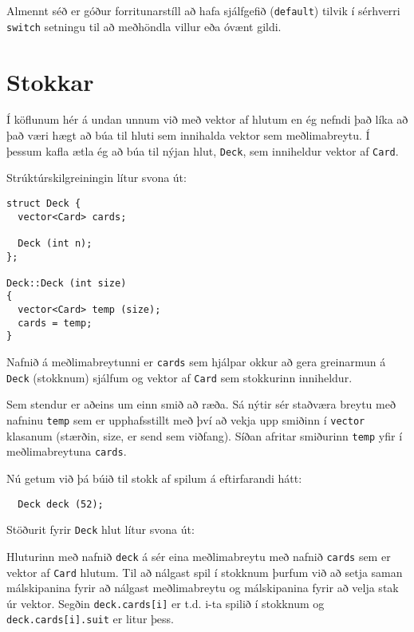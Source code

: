 
Almennt séð er góður forritunarstíll að hafa sjálfgefið ({\tt default}) tilvik í sérhverri     
{\tt switch} setningu til að meðhöndla villur eða óvænt gildi. 

\section{Stokkar}
\label{deck}

Í köflunum hér á undan unnum við með vektor af hlutum 
en ég nefndi það líka að það væri hægt að búa til hluti 
sem innihalda vektor sem meðlimabreytu.
Í þessum kafla ætla ég að búa til nýjan hlut, {\tt Deck},
sem inniheldur vektor af {\tt Card}.


Strúktúrskilgreiningin lítur svona út:

\begin{verbatim}
struct Deck {
  vector<Card> cards;

  Deck (int n);
};

Deck::Deck (int size)
{
  vector<Card> temp (size);
  cards = temp;
}
\end{verbatim}
%
Nafnið á meðlimabreytunni er {\tt cards} sem hjálpar okkur að gera
greinarmun á {\tt Deck} (stokknum) sjálfum og vektor af {\tt Card} sem stokkurinn inniheldur.



Sem stendur er aðeins um einn smið að ræða.
Sá nýtir sér staðværa breytu með nafninu {\tt temp} sem er upphafsstillt
með því að vekja upp smiðinn í {\tt vector} klasanum (stærðin, size, er send sem viðfang).
Síðan afritar smiðurinn {\tt temp} yfir í meðlimabreytuna {\tt cards}.

Nú getum við þá búið til stokk af spilum á eftirfarandi hátt: 

\begin{verbatim}
  Deck deck (52);
\end{verbatim}
%
Stöðurit fyrir {\tt Deck} hlut lítur svona út:


\vspace {0.1in}
\centerline{}
\vspace {0.1in}

Hluturinn með nafnið {\tt deck} á sér eina meðlimabreytu með nafnið {\tt cards}
sem er vektor af {\tt Card} hlutum.
Til að nálgast spil í stokknum þurfum við að setja saman málskipanina fyrir að nálgast meðlimabreytu
og málskipanina fyrir að velja stak úr vektor.
Segðin {\tt deck.cards[i]} er t.d. i-ta spilið í stokknum og
{\tt deck.cards[i].suit} er litur þess.

